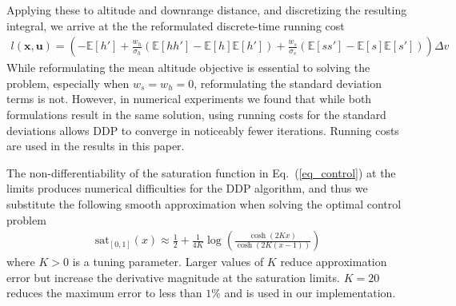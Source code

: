 \documentclass[journal ]{new-aiaa}
\newcommand{\state}{\ensuremath{\mathbf{x}}}
\newcommand{\control}{\ensuremath{\mathbf{u}}}
\newcommand{\E}[1]{\mathbb{E}\left[#1\right]}
\begin{document}
Applying these to altitude and downrange distance, and discretizing the resulting integral, we arrive at the 
the reformulated discrete-time running cost
\begin{align}
l(\state,\control) = \left(-\E{h'} +  \frac{w_h}{\sigma_h}(\E{hh'}-\E{h}\E{h'}) + \frac{w_s}{\sigma_s}(\E{ss'}-\E{s}\E{s'})\right)\Delta v
\end{align}
While reformulating the mean altitude objective is essential to solving the problem, especially when $w_s=w_h=0$, reformulating the standard deviation terms is not. However, in numerical experiments we found that while both formulations result in the same solution, using running costs for the standard deviations allows DDP to converge in noticeably fewer iterations. Running costs are used in the results in this paper.

The non-differentiability of the saturation function in Eq.~(\ref{eq_control}) at the limits produces numerical difficulties for the DDP algorithm, and thus we substitute the following smooth approximation when solving the optimal control problem
\begin{align*}
\mathrm{sat}_{[0,1]}(x) \approx \frac{1}{2} + \frac{1}{4K}\log\left(\frac{\cosh (2Kx)}{\cosh (2K(x-1))}\right) 
\end{align*}
where $K>0$ is a tuning parameter. Larger values of $K$ reduce approximation error but increase the derivative magnitude at the saturation limits. $K=20$ reduces the maximum error to less than $1\%$ and is used in our implementation.

\end{document}
